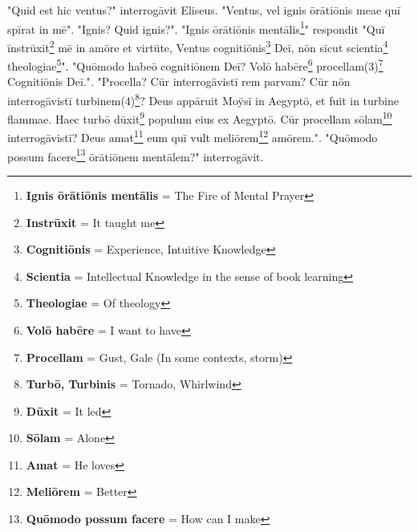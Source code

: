 "Quid est hic ventus?" interrogāvit Eliseus. "Ventus, vel ignis ōrātiōnis meae quī spīrat in mē". "Ignis? Quid ignis?". "Ignis ōrātiōnis mentālis\footnote{\textbf{Ignis ōrātiōnis mentālis} = The Fire of Mental Prayer}" respondit "Quī īnstrūxit\footnote{\textbf{Instrūxit} = It taught me} mē in amōre et virtūte, Ventus cognitiōnis\footnote{\textbf{Cognitiōnis} = Experience, Intuitive Knowledge} Deī, nōn sīcut scientia\footnote{\textbf{Scientia} = Intellectual Knowledge in the sense of book learning} theologiae\footnote{\textbf{Theologiae} = Of theology}". "Quōmodo habeō cognitiōnem Deī? Volō habēre\footnote{\textbf{Volō habēre} = I want to have} procellam(3)\footnote{\textbf{Procellam} = Gust, Gale (In some contexts, storm) } Cognitiōnis Deī.". "Procella? Cūr interrogāvistī rem parvam? Cūr nōn interrogāvistī turbinem(4)\footnote{\textbf{Turbō, Turbinis} = Tornado, Whirlwind}? Deus appāruit Moȳsī in Aegyptō, et fuit in turbine flammae. Haec turbō dūxit\footnote{\textbf{Dūxit} = It led} populum eius ex Aegyptō. Cūr procellam sōlam\footnote{\textbf{Sōlam} = Alone} interrogāvistī? Deus amat\footnote{\textbf{Amat} = He loves} eum quī vult meliōrem\footnote{\textbf{Meliōrem} = Better} amōrem.". "Quōmodo possum facere\footnote{\textbf{Quōmodo possum facere} = How can I make} ōrātiōnem mentālem?" interrogāvit. 

